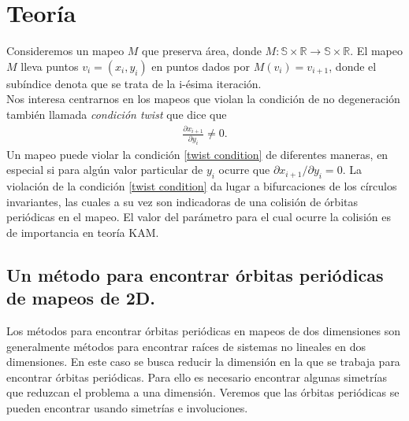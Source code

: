 
\chapter{Teor\'ia}
Consideremos un mapeo $M$ que preserva \'area, donde $M:\mathbb{S} \times \mathbb{R} \longrightarrow \mathbb{S}\times\mathbb{R}$. El mapeo $M$ lleva puntos $v_{i}= (x_{i},y_{i})$ en puntos dados por $M(v_{i})=v_{i+1}$, donde el sub\'indice denota que se trata de la i-\'esima iteraci\'on. \\

Nos interesa centrarnos en los mapeos que violan la condici\'on de no degeneraci\'on tambi\'en llamada \textit{condici\'on twist} \cite{Olvera} que dice que 
\begin{eqnarray}
\frac{\partial x_{i+1}}{\partial y_{i}} \neq 0.
\label{twist condition}
\end{eqnarray}
Un mapeo puede violar la condici\'on \ref{twist condition} de diferentes maneras, en especial si para alg\'un valor particular de $y_{i}$ ocurre que $\partial x_{i+1}/\partial y_{i} = 0$. La violaci\'on de la condici\'on \ref{twist condition} da lugar a bifurcaciones de los c\'irculos invariantes, las cuales a su vez son indicadoras de una colisi\'on de \'orbitas peri\'odicas en el mapeo. El valor del par\'ametro para el cual ocurre la colisi\'on es de importancia en teor\'ia KAM. 

\section{Un m\'etodo para encontrar \'orbitas peri\'odicas de mapeos de 2D.}

Los m\'etodos para encontrar \'orbitas peri\'odicas en mapeos de dos dimensiones son generalmente m\'etodos para encontrar ra\'ices de sistemas no lineales en dos dimensiones. En este caso se busca reducir la dimensi\'on en la que se trabaja para encontrar \'orbitas peri\'odicas. Para ello es necesario encontrar algunas simetr\'ias que reduzcan el problema a una dimensi\'on. Veremos que las \'orbitas peri\'odicas se pueden encontrar usando simetr\'ias e involuciones. \cite{GreeneA}\\

